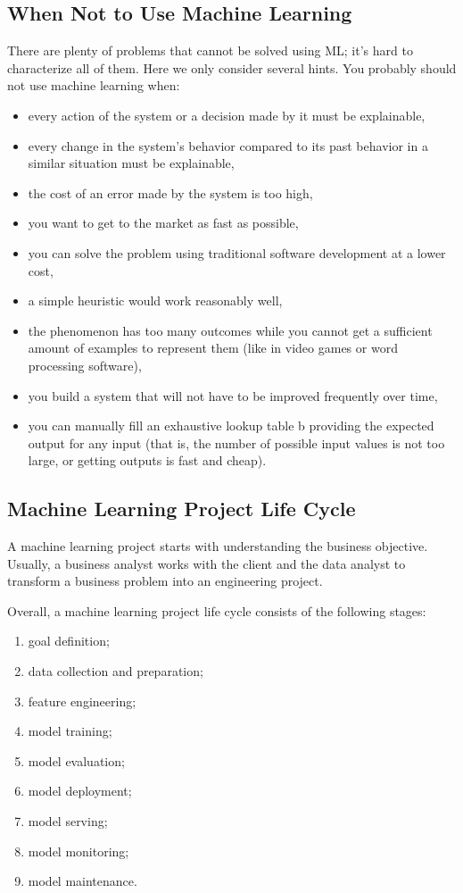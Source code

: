 \subsection*{When Not to Use Machine Learning}

There are plenty of problems that cannot be solved using ML;
it's hard to characterize all of them. Here we only consider
several hints. You probably should not use machine learning
when:
\begin{itemize}
    \item every action of the system or a decision made by it
    must be explainable,
    \item every change in the system's behavior compared to its
    past behavior in a similar situation must be explainable,
    \item the cost of an error made by the system is too high,
    \item you want to get to the market as fast as possible,
    \item you can solve the problem using traditional software
    development at a lower cost,
    \item a simple heuristic would work reasonably well,
    \item the phenomenon has too many outcomes while you cannot
    get a sufficient amount of examples to represent them
    (like in video games or word processing software),
    \item you build a system that will not have to be improved
    frequently over time,
    \item you can manually fill an exhaustive lookup table b
    providing the expected output for any input (that is,
    the number of possible input values is not too large,
    or getting outputs is fast and cheap).
\end{itemize}



\subsection{Machine Learning Project Life Cycle}
A machine learning project starts with understanding the business
objective. Usually, a business analyst works with the client and
the data analyst to transform a business problem into an
engineering project.

Overall, a machine learning project life cycle consists of the
following stages: 
\begin{enumerate}
    \item goal definition;
    \item data collection and preparation;
    \item feature engineering;
    \item model training;
    \item model evaluation;
    \item model deployment;
    \item model serving;
    \item model monitoring;
    \item model maintenance.
\end{enumerate}



